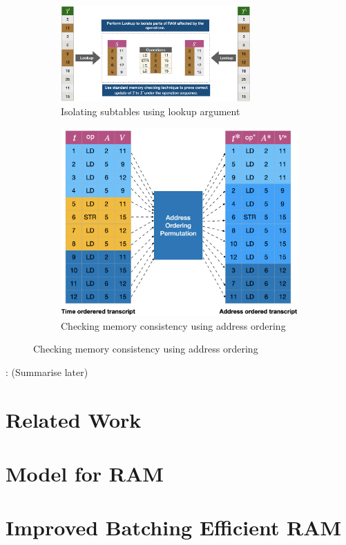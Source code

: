 \documentclass[11pt]{article}
\begin{document}
    \begin{figure}[t]
    \begin{subfigure}{\textwidth}
    \centering
    \includegraphics[width=0.8\textwidth]{example-lookup}
    \caption{Isolating subtables using lookup argument}
    \label{fig:subtable-consistency}
    \end{subfigure}
    \begin{subfigure}{\textwidth}
    \centering
        \includegraphics[height=0.3\textheight]{Address-ordered}
        \caption{Checking memory consistency using address ordering}
        \label{fig:permuted-transcripts}
    \end{subfigure}
    \end{figure}


    : (Summarise later)

    \section{Related Work}\label{sec:rel-work}

    \section{Model for RAM}\label{sec:model-for-ram}
    

    \section{Improved Batching Efficient RAM}\label{sec:batch-efficient-ram}
    


    
    
\end{document}

